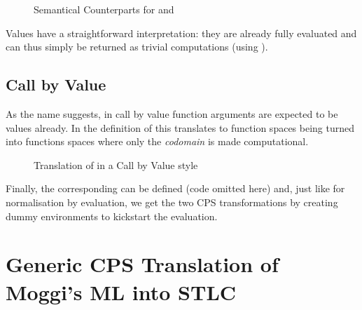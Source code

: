 \begin{figure}[h]
\caption{Semantical Counterparts for  and \label{fig:cbnelim}}
\end{figure}

Values have a straightforward interpretation: they are already fully evaluated
and can thus simply be returned as trivial computations (using ).


\subsection{Call by Value}

As the name suggests, in call by value function arguments are expected to be values
already. In the definition of  this translates to function spaces being
turned into functions spaces where only the \emph{codomain} is made computational.

\begin{figure}[h]
\caption{Translation of  in a Call by Value style\label{fig:moggicbv}}
\end{figure}




Finally, the corresponding  can be defined (code omitted here)
and, just like for normalisation by evaluation, we get the two CPS transformations
by creating dummy environments to kickstart the evaluation.

\section{Generic CPS Translation of Moggi's ML into STLC}
